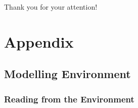 \documentclass[
	hyperref={pdfusetitle,hidelinks},
	10pt,
    handout,
]{beamer}
\begin{document}
\begin{frame}{}
	\begin{center}
		\Large Thank you for your attention!
	\end{center}
\end{frame}

\section{Appendix}

\subsection{Modelling Environment} %

\subsubsection{Reading from the Environment}
\end{document}
